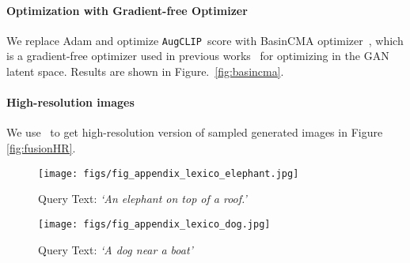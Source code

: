 \documentclass[10pt,twocolumn,letterpaper]{article}
\newcommand{\ourloss}{\texttt{AugCLIP}}
\begin{document}
\paragraph{Optimization with Gradient-free Optimizer}
We replace Adam and optimize \ourloss~score with BasinCMA optimizer~\cite{wampler2009optimal}, which is a gradient-free optimizer used in previous works~\cite{huh2020transforming, bau2019seeing} for optimizing in the GAN latent space. Results are shown in Figure.~\ref{fig:basincma}.
\vspace{.5\baselineskip}

\paragraph{High-resolution images} We use~\cite{wang2021realesrgan} to get high-resolution version of sampled generated images in Figure \ref{fig:fusionHR}.

\begin{figure*}
    \centering
    \begin{subfigure}{1.\textwidth}
      \centering
      \texttt{[image: figs/fig\_appendix\_lexico\_elephant.jpg]}  
      \caption{Query Text: \emph{`An elephant on top of a roof.'}}
      \label{fig:lexico_elephant}
    \end{subfigure}
    
    \begin{subfigure}{1.\textwidth}
      \centering
      \texttt{[image: figs/fig\_appendix\_lexico\_dog.jpg]}
      \caption{Query Text: \emph{`A dog near a boat'}}
      \label{fig:lexico_dog}
    \end{subfigure}
    \caption{We show two examples to demonstrate the benefit of using our bi-level optimization formulation in composed generation. We compare our formulation~\eqref{eq:bilevel} with the inverse bi-level optimization~\eqref{eq:r-bilevel} and linear combination method~\eqref{eq:linear}. We search the linear combination coefficient $\lambda$ from $0.1$ to $0.9$ uniformly. Observations: 
    (1) For the linear combination method, 
    For two text queries (a) and (b), the effect of similar $\lambda$ is different. For instance, when $\lambda = 0.5$, the generated image for (a) has acceptable visual quality, but the generated image for (b) failed to generate recognizable \emph{`dog'}; (2) Instead, our bi-level optimization formulation~\eqref{eq:bilevel} with dynamic-barrier gradient descent relieves the user from tuning $\lambda$ for each image. It yields low perceptual loss without sacrificing too much of the \ourloss~score, and finally generates natural fused images; (3) The inverse bi-level optimization~\eqref{eq:r-bilevel} formulation cannot get good results.}
    \label{fig:appendix_lexico}
\end{figure*}
\end{document}
